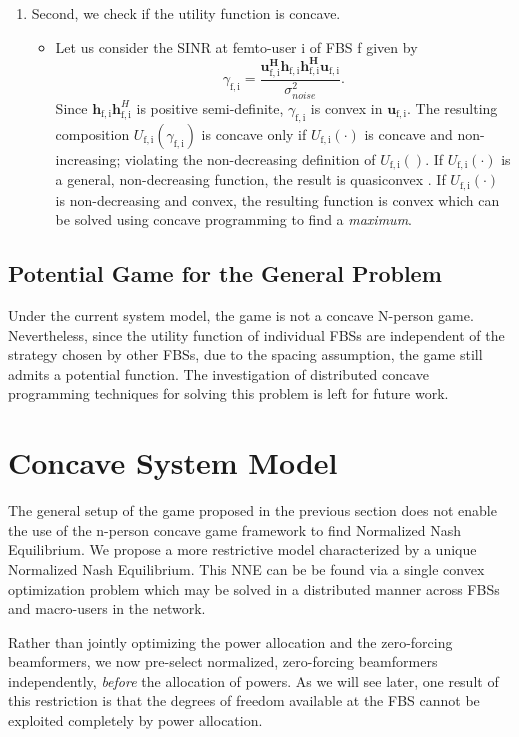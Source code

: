 \documentclass[12pt,a4paper]{report}
\begin{document}
\begin{enumerate}
\item Second, we check if the utility function is concave.
\begin{itemize}
\item 
Let us consider the SINR at femto-user i of FBS f given by
	\begin{equation*}\label{zf_snr}
	\gamma_{\mathrm{f,i}} = 
	\frac{\mathbf{u^H_{\mathrm{f,i}}h_{\mathrm{f,i}}h^H_{\mathrm{f,i}}u_{\mathrm{f,i}}}}
	{\sigma^2_{noise}  
	}.
	\end{equation*}
	Since
	 $\mathbf{h}_{\mathrm{f,i}}\mathbf{h}^H_{\mathrm{f,i}}$ is positive semi-definite, $\gamma_{\mathrm{f,i}}$ is convex in ${\mathbf{u}_{\mathrm{f,i}}}$. 
	 The resulting composition $U_{\mathrm{f,i}}(\gamma_{\mathrm{f,i}}) $ is concave only if $U_{\mathrm{f,i}}(\cdot) $ is concave and non-increasing; violating the non-decreasing definition of $U_{\mathrm{f,i}}() $.
If $U_{\mathrm{f,i}}(\cdot) $ is a general, non-decreasing function, the result is quasiconvex \cite[p.~102]{BoV:04}. If $U_{\mathrm{f,i}}(\cdot) $ is  non-decreasing and convex, the resulting
   function is convex which can be solved using concave programming to find a \emph{maximum}.
\end{itemize}

\end{enumerate}

\subsection{Potential Game for the General Problem}
Under the current system model, the game is not a concave N-person game. Nevertheless, since the utility function of individual FBSs are independent of the strategy chosen by other FBSs, due to the spacing assumption, the game still admits a potential function. The investigation of distributed concave programming techniques for solving this problem is left for future work. 

\section{Concave System Model}\label{conmodel}

The general setup of the game proposed in the previous section does not enable the use of the n-person concave game framework to find Normalized Nash Equilibrium. We propose a more restrictive model characterized by a unique Normalized Nash Equilibrium. This NNE can be be found via a single convex optimization problem which may be solved in a distributed manner across FBSs and macro-users in the network.
\par
Rather than jointly optimizing the power allocation and the zero-forcing beamformers, we now pre-select normalized, zero-forcing beamformers independently, \emph{before} the allocation of powers.
As we will see later, one result of this restriction is that the degrees of freedom available at the FBS cannot be exploited completely by power allocation. 
\end{document}

